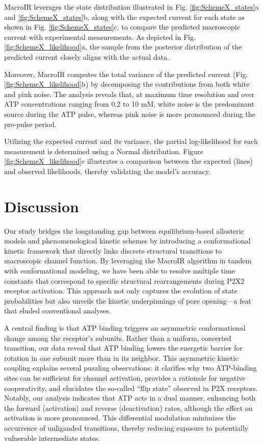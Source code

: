 \documentclass[pdflatex,sn-mathphys-num]{sn-jnl}%
\theoremstyle{thmstyleone}%
\theoremstyle{thmstyletwo}%
\theoremstyle{thmstylethree}%
\begin{document}
MacroIR leverages the state distribution illustrated in Fig. \ref{fig:SchemeX_states}a and \ref{fig:SchemeX_states}b, along with the expected current for each state as shown in Fig. \ref{fig:SchemeX_states}c, to compare the predicted macroscopic current with experimental measurements. As depicted in Fig. \ref{fig:SchemeX_likelihood}a, the sample from the posterior distribution of the predicted current closely aligns with the actual data. 

Moreover, MacroIR computes the total variance of the predicted current (Fig. \ref{fig:SchemeX_likelihood}b) by decomposing the contributions from both white and pink noise. The analysis reveals that, at maximum time resolution and over ATP concentrations ranging from 0.2 to 10 mM, white noise is the predominant source during the ATP pulse, whereas pink noise is more pronounced during the pre-pulse period.

Utilizing the expected current and its variance, the partial log-likelihood for each measurement is determined using a Normal distribution. Figure \ref{fig:SchemeX_likelihood}c illustrates a comparison between the expected (lines) and observed likelihoods, thereby validating the model's accuracy.


\section{Discussion}

Our study bridges the longstanding gap between equilibrium-based allosteric models and phenomenological kinetic schemes by introducing a conformational kinetic framework that directly links discrete structural transitions to macroscopic channel function. By leveraging the MacroIR algorithm in tandem with conformational modeling, we have been able to resolve multiple time constants that correspond to specific structural rearrangements during P2X2 receptor activation. This approach not only captures the evolution of state probabilities but also unveils the kinetic underpinnings of pore opening—a feat that eluded conventional analyses.

A central finding is that ATP binding triggers an asymmetric conformational change among the receptor’s subunits. Rather than a uniform, concerted transition, our data reveal that ATP binding lowers the energetic barrier for rotation in one subunit more than in its neighbor. This asymmetric kinetic coupling explains several puzzling observations: it clarifies why two ATP-binding sites can be sufficient for channel activation, provides a rationale for negative cooperativity, and elucidates the so-called “flip state” observed in P2X receptors. Notably, our analysis indicates that ATP acts in a dual manner, enhancing both the forward (activation) and reverse (deactivation) rates, although the effect on activation is more pronounced. This differential modulation minimizes the occurrence of unliganded transitions, thereby reducing exposure to potentially vulnerable intermediate states.
\end{document}
